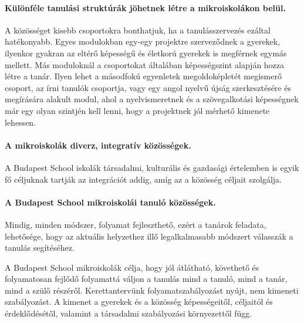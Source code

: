   \paragraph{Különféle tanulási struktúrák jöhetnek létre a mikroiskolákon belül.}

    A közösséget kisebb csoportokra bonthatjuk, ha a tanulásszervezés ezáltal
    hatékonyabb. Egyes modulokban egy-egy projektre szerveződnek a gyerekek,
    ilyenkor gyakran az eltérő képességű és életkorú gyerekek is megférnek egymás
    mellett. Más moduloknál a csoportokat általában képességszint alapján hozza
    létre a tanár. Ilyen lehet a másodfokú egyenletek megoldoképletét megismerő
    csoport, az írni tanulók csoportja, vagy egy angol nyelvű újság szerkesztésére
    és megírására alakult modul, ahol a nyelvismeretnek és a szövegalkotási
    képességnek már egy olyan szintjén kell lenni, hogy a projektnek jól mérhető
    kimenete lehessen.

  \paragraph{A mikroiskolák diverz, integratív közösségek.} A Budapest School iskolák társadalmi,
  kulturális és gazdasági értelemben is egyik fő céljuknak tartják az integrációt addig,
  amíg az a közösség céljait szolgálja.

  \paragraph{A Budapest School mikroiskolái tanuló közösségek.} Mindig, minden módszer,
  folyamat fejleszthető, ezért a tanárok feladata, lehetősége, hogy az aktuális
  helyzethez illő legalkalmasabb módszert válasszák a tanulás segítéséhez.

  A Budapest School mikroiskolák célja, hogy jól átlátható, követhető és
  folyamatosan fejlődő folyamattá váljon a tanulás mind a tanuló, mind a tanár, mind
  a szülő részéről. Kerettantervünk folyamatszabályozást nyújt, nem kimeneti
  szabályozást. A kimenet a gyerekek és a közösség képességeitől, céljaitól és érdeklődésétől,
  valamint a társadalmi szabályozási környezettől függ.


